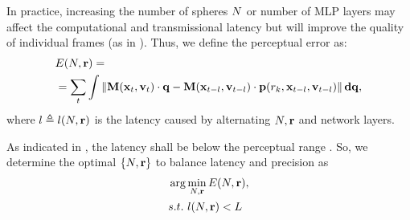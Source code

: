 In practice, increasing the number of spheres $N$ or number of MLP layers may affect the computational and transmissional latency but will improve the quality of individual frames (as in ). Thus, we define the perceptual error as:
\begin{equation}
\begin{aligned}
&E(N, \mathbf{r}) = \\
&= \sum_t\int \left\lVert\mathbf{M}(\mathbf{x}_t,\mathbf{v}_t)\cdot\mathbf{q}-\mathbf{M}(\mathbf{x}_{t-l},\mathbf{v}_{t-l})\cdot\mathbf{p}(r_k,\mathbf{x}_{t-l},\mathbf{v}_{t-l})\right\rVert\mathbf{d}\mathbf{q},
\end{aligned}
\end{equation}
where $l\triangleq l(N, \mathbf{r})$ is the latency caused by alternating  $N, \mathbf{r}$ and network layers.

As indicated in \cite{albert2017latency}, the latency shall be below the perceptual range . So, we determine the optimal $\{N, \mathbf{r}\}$ to balance latency and precision as
\begin{equation}
\begin{aligned}
    &\arg\min_{N, \mathbf{r}} E(N, \mathbf{r}), \\
    & s.t.\ {l(N, \mathbf{r})} < L
\end{aligned}
\end{equation}


